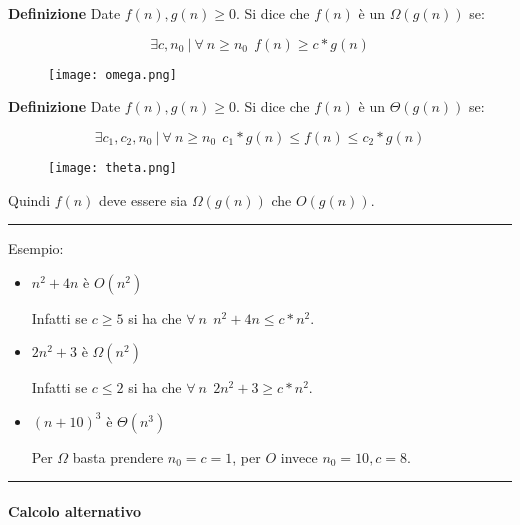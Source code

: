 \documentclass{article}
\begin{document}
\noindent\textbf{Definizione} Date $f(n),g(n)\geq 0$. Si dice che $f(n)$ è un $\Omega(g(n))$ se:

$$\exists c,n_0\ |\ \forall\ n\geq n_0\ \ f(n)\geq c*g(n)$$\newline

\begin{figure}[ht]
    \centering
    \texttt{[image: omega.png]}
    \label{fig:omega}
\end{figure}

\newpage

\noindent\textbf{Definizione} Date $f(n),g(n)\geq 0$. Si dice che $f(n)$ è un $\Theta(g(n))$ se:

$$\exists c_1,c_2,n_0\ |\ \forall\ n\geq n_0\ \ c_1*g(n)\leq f(n)\leq c_2*g(n)$$\newline

\begin{figure}[ht]
    \centering
    \texttt{[image: theta.png]}
    \label{fig:theta}
\end{figure}

\noindent Quindi $f(n)$ deve essere sia $\Omega(g(n))$ che $O(g(n))$.

\noindent\rule{\textwidth}{0.5pt}\newline

\noindent Esempio:\newline

\begin{itemize}
    \item $n^2+4n$ è $O(n^2)$

    Infatti se $c\geq5$ si ha che $\forall \ n \ \ n^2+4n\leq c*n^2$.

    \item $2n^2+3$ è $\Omega(n^2)$

    Infatti se $c\leq2$ si ha che $\forall \ n \ \ 2n^2+3\geq c*n^2$.

    \item $(n+10)^3$ è $\Theta(n^3)$

    Per $\Omega$ basta prendere $n_0=c=1$, per $O$ invece $n_0=10,c=8$.
    
\end{itemize}

\noindent\rule{\textwidth}{0.5pt}\newline

\paragraph{Calcolo alternativo} $\ $\newline
\end{document}
